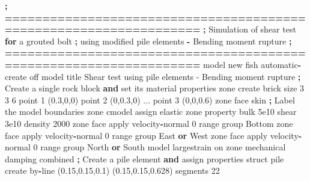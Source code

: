 \documentclass[a4paper, nobind]{templates/ociamthesis}
\newenvironment{Shaded}{\begin{snugshade}}{\end{snugshade}}
\newcommand{\BuiltInTok}[1]{#1}
\newcommand{\ControlFlowTok}[1]{\textcolor[rgb]{0.13,0.29,0.53}{\textbf{#1}}}
\newcommand{\DecValTok}[1]{\textcolor[rgb]{0.00,0.00,0.81}{#1}}
\newcommand{\FloatTok}[1]{\textcolor[rgb]{0.00,0.00,0.81}{#1}}
\newcommand{\KeywordTok}[1]{\textcolor[rgb]{0.13,0.29,0.53}{\textbf{#1}}}
\newcommand{\NormalTok}[1]{#1}
\newcommand{\OperatorTok}[1]{\textcolor[rgb]{0.81,0.36,0.00}{\textbf{#1}}}
\newcommand{\StringTok}[1]{\textcolor[rgb]{0.31,0.60,0.02}{#1}}
\renewenvironment{Shaded}
{
  \vspace{10pt}%
  \begin{snugshade}%
}{%
  \end{snugshade}%
  \vspace{8pt}%
}
\begin{document}
\begin{Shaded}
\begin{Highlighting}[]
    \OperatorTok{;} \OperatorTok{==================================================================}
    \OperatorTok{;}\NormalTok{   Simulation of shear test }\ControlFlowTok{for}\NormalTok{ a grouted bolt}
    \OperatorTok{;}\NormalTok{   using modified pile elements }\OperatorTok{{-}}\NormalTok{ Bending moment rupture}
    \OperatorTok{;} \OperatorTok{==================================================================}
\NormalTok{    model new}
\NormalTok{    fish automatic}\OperatorTok{{-}}\NormalTok{create off}
\NormalTok{    model title }\StringTok{\textquotesingle{}Shear test using pile elements {-} Bending moment rupture\textquotesingle{}}
    \OperatorTok{;}\NormalTok{ Create a single rock block }\KeywordTok{and} \BuiltInTok{set}\NormalTok{ its material properties}
\NormalTok{    zone create brick size }\DecValTok{3} \DecValTok{3} \DecValTok{6}\NormalTok{ point }\DecValTok{1}\NormalTok{ (}\FloatTok{0.3}\NormalTok{,}\DecValTok{0}\NormalTok{,}\DecValTok{0}\NormalTok{) point }\DecValTok{2}\NormalTok{ (}\DecValTok{0}\NormalTok{,}\FloatTok{0.3}\NormalTok{,}\DecValTok{0}\NormalTok{) ...}
\NormalTok{                                 point }\DecValTok{3}\NormalTok{ (}\DecValTok{0}\NormalTok{,}\DecValTok{0}\NormalTok{,}\FloatTok{0.6}\NormalTok{)}
\NormalTok{    zone face skin }\OperatorTok{;}\NormalTok{ Label the model boundaries}
\NormalTok{    zone cmodel assign elastic}
\NormalTok{    zone }\BuiltInTok{property}\NormalTok{ bulk }\FloatTok{5e10}\NormalTok{ shear }\FloatTok{3e10}\NormalTok{ density }\DecValTok{2000}
\NormalTok{    zone face }\BuiltInTok{apply}\NormalTok{ velocity}\OperatorTok{{-}}\NormalTok{normal }\DecValTok{0} \BuiltInTok{range}\NormalTok{ group }\StringTok{\textquotesingle{}Bottom\textquotesingle{}}
\NormalTok{    zone face }\BuiltInTok{apply}\NormalTok{ velocity}\OperatorTok{{-}}\NormalTok{normal }\DecValTok{0} \BuiltInTok{range}\NormalTok{ group }\StringTok{\textquotesingle{}East\textquotesingle{}} \KeywordTok{or} \StringTok{\textquotesingle{}West\textquotesingle{}}
\NormalTok{    zone face }\BuiltInTok{apply}\NormalTok{ velocity}\OperatorTok{{-}}\NormalTok{normal }\DecValTok{0} \BuiltInTok{range}\NormalTok{ group }\StringTok{\textquotesingle{}North\textquotesingle{}} \KeywordTok{or} \StringTok{\textquotesingle{}South\textquotesingle{}}
\NormalTok{    model largestrain on}
\NormalTok{    zone mechanical damping combined}
    \OperatorTok{;}\NormalTok{ Create a pile element }\KeywordTok{and}\NormalTok{ assign properties}
\NormalTok{    struct pile create by}\OperatorTok{{-}}\NormalTok{line (}\FloatTok{0.15}\NormalTok{,}\FloatTok{0.15}\NormalTok{,}\FloatTok{0.1}\NormalTok{) (}\FloatTok{0.15}\NormalTok{,}\FloatTok{0.15}\NormalTok{,}\FloatTok{0.628}\NormalTok{) segments }\DecValTok{22}

\end{Highlighting}
\end{Shaded}
\end{document}
